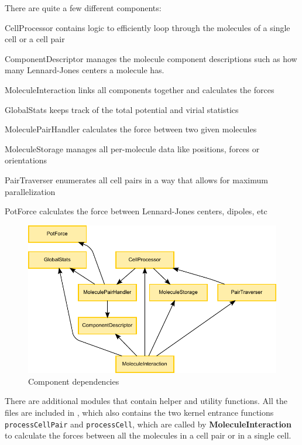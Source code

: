 There are quite a few different components:
\begin{compactdesc}
\item[CellProcessor] contains logic to efficiently loop through the molecules of a single cell or a cell pair
\item[ComponentDescriptor] manages the molecule component descriptions such as how many Lennard-Jones centers a molecule has.
\item[MoleculeInteraction] links all components together and calculates the forces
\item[GlobalStats] keeps track of the total potential and virial statistics
\item[MoleculePairHandler] calculates the force between two given molecules
\item[MoleculeStorage] manages all per-molecule data like positions, forces or orientations
\item[PairTraverser] enumerates all cell pairs in a way that allows for maximum parallelization
\item[PotForce] calculates the force between Lennard-Jones centers, dipoles, etc
\end{compactdesc}

\begin{figure}
\caption{Component dependencies}
\includegraphics{figures/component_dependencies.pdf}
\end{figure}

There are additional \cuda{} modules that contain helper and utility functions.
All the  files are included in , which also contains the two kernel entrance functions \lstinline!processCellPair! and \lstinline!processCell!, which are called by \textbf{MoleculeInteraction} to calculate the forces between all the molecules in a cell pair or in a single cell.


